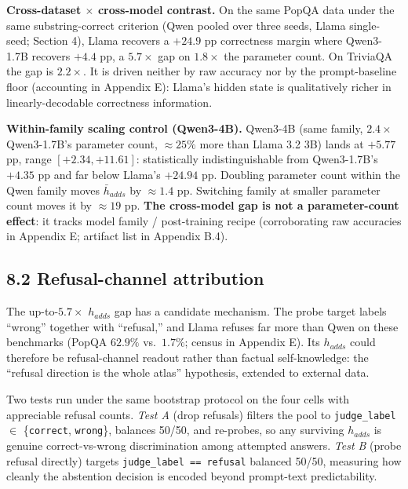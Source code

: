 \textbf{Cross-dataset \(\times\) cross-model contrast.} On the same
PopQA data under the same substring-correct criterion (Qwen pooled over
three seeds, Llama single-seed; Section 4), Llama recovers a
\(+24.9\) pp correctness margin where Qwen3-1.7B recovers \(+4.4\) pp, a
\(5.7\times\) gap on \(1.8\times\) the parameter count. On TriviaQA the
gap is \(2.2\times\). It is driven neither by raw accuracy nor by the
prompt-baseline floor (accounting in Appendix E): Llama's hidden state
is qualitatively richer in linearly-decodable correctness information.

\textbf{Within-family scaling control (Qwen3-4B).} Qwen3-4B (same
family, \(2.4\times\) Qwen3-1.7B's parameter count, \(\approx 25\%\)
more than Llama 3.2 3B) lands at \(+5.77\) pp, range
\([+2.34, +11.61]\): statistically indistinguishable from Qwen3-1.7B's
\(+4.35\) pp and far below Llama's \(+24.94\) pp. Doubling parameter
count within the Qwen family moves \(\bar h_{adds}\) by \(\approx 1.4\)
pp. Switching family at smaller parameter count moves it by
\(\approx 19\) pp. \textbf{The cross-model gap is not a parameter-count
effect}: it tracks model family / post-training recipe (corroborating
raw accuracies in Appendix E; artifact list in Appendix B.4).

\subsection{8.2 Refusal-channel
attribution}\label{refusal-channel-attribution}

The up-to-\(5.7\times\) \(h_{adds}\) gap has a candidate mechanism. The probe target labels ``wrong'' together with
``refusal,'' and Llama refuses far more than Qwen on these benchmarks
(PopQA \(62.9\%\) vs.~\(1.7\%\); census in Appendix E). Its \(h_{adds}\) could therefore be refusal-channel readout rather than factual
self-knowledge: the ``refusal direction is the whole atlas'' hypothesis,
extended to external data.

Two tests run under the same bootstrap protocol on the four cells with
appreciable refusal counts. \emph{Test A} (drop refusals) filters the
pool to \texttt{judge\_label} \(\in\) \{\texttt{correct},
\texttt{wrong}\}, balances 50/50, and re-probes, so any surviving
\(h_{adds}\) is genuine correct-vs-wrong discrimination among attempted
answers. \emph{Test B} (probe refusal directly) targets
\texttt{judge\_label\ ==\ \textquotesingle{}refusal\textquotesingle{}}
balanced 50/50, measuring how cleanly the abstention decision is encoded
beyond prompt-text predictability.

